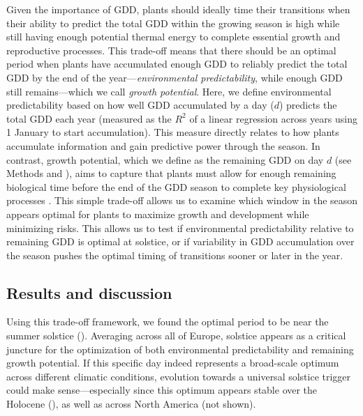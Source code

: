 \documentclass[11pt,letter]{article}
\begin{document}
Given the importance of GDD, plants should ideally time their transitions when their ability to predict the total GDD within the growing season is high while still having enough potential thermal energy to complete essential growth and reproductive processes. This trade-off means that there should be an optimal period when plants have accumulated enough GDD to reliably predict the total GDD by the end of the year---\emph{environmental predictability}, while enough GDD still remains---which we call \emph{growth potential}. Here, we define environmental predictability based on how well GDD accumulated by a day ($d$) predicts the total GDD each year (measured as the $R^2$ of a linear regression across years using 1 January to start accumulation). This measure directly relates to how plants accumulate information and gain predictive power through the season.
In contrast, growth potential, which we define as the remaining GDD on day $d$ (see Methods and ), aims to capture that plants must allow for enough remaining biological time before the end of the GDD season to complete key physiological processes \citep{Zohner2023, Journe2024}. This simple trade-off allows us to examine which window in the season appears optimal for plants to maximize growth and development while minimizing risks. This allows us to test if environmental predictability relative to remaining GDD is optimal at solstice, or if variability in GDD accumulation over the season pushes the optimal timing of transitions sooner or later in the year. 

\subsection*{Results and discussion}

Using this trade-off framework, we found the optimal period to be near the summer solstice (). Averaging across all of Europe, solstice appears as a critical juncture for the optimization of both environmental predictability and remaining growth potential.
If this specific day indeed represents a broad-scale optimum across different climatic conditions, evolution towards a universal solstice trigger could make sense---especially since this optimum appears stable over the Holocene (), as well as across North America (not shown).
\end{document}
